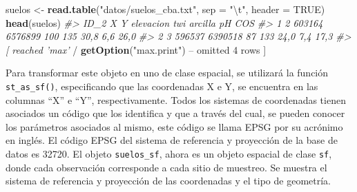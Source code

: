 \documentclass[11pt,b5paper,]{krantz}
\newenvironment{Shaded}{}{}
\newcommand{\CharTok}[1]{\textcolor[rgb]{0.25,0.44,0.63}{#1}}
\newcommand{\CommentTok}[1]{\textcolor[rgb]{0.38,0.63,0.69}{\textit{#1}}}
\newcommand{\DataTypeTok}[1]{\textcolor[rgb]{0.56,0.13,0.00}{#1}}
\newcommand{\DecValTok}[1]{\textcolor[rgb]{0.25,0.63,0.44}{#1}}
\newcommand{\KeywordTok}[1]{\textcolor[rgb]{0.00,0.44,0.13}{\textbf{#1}}}
\newcommand{\NormalTok}[1]{#1}
\newcommand{\OperatorTok}[1]{\textcolor[rgb]{0.40,0.40,0.40}{#1}}
\newcommand{\OtherTok}[1]{\textcolor[rgb]{0.00,0.44,0.13}{#1}}
\newcommand{\StringTok}[1]{\textcolor[rgb]{0.25,0.44,0.63}{#1}}
\begin{document}
\begin{Shaded}
\begin{Highlighting}[]
\NormalTok{suelos <-}\StringTok{ }\KeywordTok{read.table}\NormalTok{(}\StringTok{"datos/suelos_cba.txt"}\NormalTok{, }
                     \DataTypeTok{sep =} \StringTok{"}\CharTok{\textbackslash{}t}\StringTok{"}\NormalTok{, }\DataTypeTok{header =} \OtherTok{TRUE}\NormalTok{)}
\KeywordTok{head}\NormalTok{(suelos)}
\CommentTok{#> ID_2 X Y elevacion twi arcilla pH COS}
\CommentTok{#> 1 2 603164 6576899 100 135 30,8 6,6 26,0}
\CommentTok{#> 2 3 596537 6390518 87 133 24,0 7,4 17,3}
\CommentTok{#> [ reached 'max'}
    \OperatorTok{/}\StringTok{ }\KeywordTok{getOption}\NormalTok{(}\StringTok{"max.print"}\NormalTok{) }\OperatorTok{--}
\NormalTok{omitted }\DecValTok{4}\NormalTok{ rows ]}
\end{Highlighting}
\end{Shaded}

Para transformar este objeto en uno de clase espacial, se utilizará la función \texttt{st\_as\_sf()}, especificando que las coordenadas X e Y, se encuentra en las columnas ``X'' e ``Y'', respectivamente. Todos los sistemas de coordenadas tienen asociados un código que los identifica y que a través del cual, se pueden conocer los parámetros asociados al mismo, este código se llama EPSG por su acrónimo en inglés. El código EPSG del sistema de referencia y proyección de la base de datos es 32720. El objeto \texttt{suelos\_sf}, ahora es un objeto espacial de clase \texttt{sf}, donde cada observación corresponde a cada sitio de muestreo. Se muestra el sistema de referencia y proyección de las coordenadas y el tipo de geometría.
\end{document}
